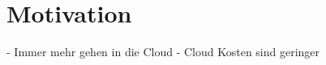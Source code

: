 \section{Motivation}

- Immer mehr gehen in die Cloud
- Cloud Kosten sind geringer \autocite{villamizar2017cost}
